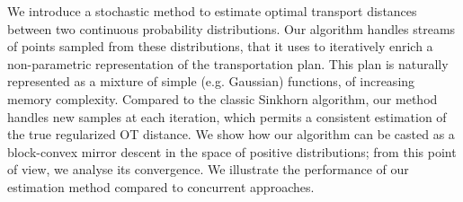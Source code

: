 We introduce a stochastic method to estimate optimal transport distances between
two continuous probability distributions. Our algorithm handles streams of
points sampled from these distributions, that it uses to iteratively enrich a
non-parametric representation of the transportation plan. This plan is naturally
represented as a mixture of simple (e.g. Gaussian) functions, of increasing
memory complexity. Compared to the classic Sinkhorn algorithm, our method
handles new samples at each iteration, which permits a consistent estimation of
the true regularized OT distance. We show how our algorithm can be casted as a
block-convex mirror descent in the space of positive distributions; from this
point of view, we analyse its convergence. We illustrate the performance of our
estimation method compared to concurrent approaches.